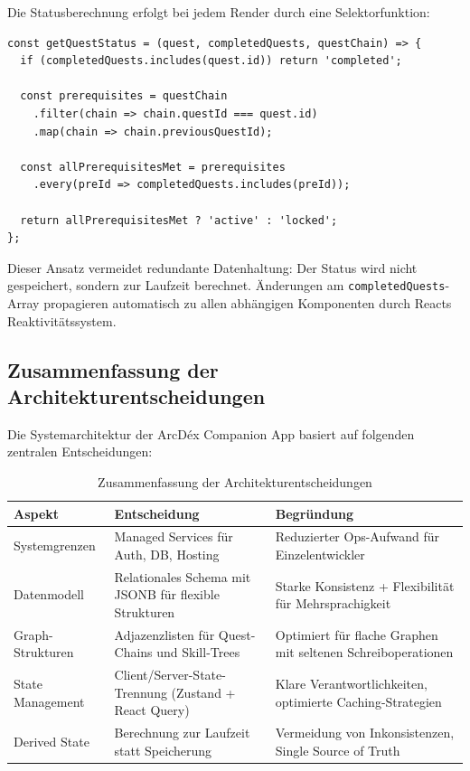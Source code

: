 Die Statusberechnung erfolgt bei jedem Render durch eine Selektorfunktion:

\begin{lstlisting}[caption={Quest-Status-Berechnung als Derived State}]
const getQuestStatus = (quest, completedQuests, questChain) => {
  if (completedQuests.includes(quest.id)) return 'completed';
  
  const prerequisites = questChain
    .filter(chain => chain.questId === quest.id)
    .map(chain => chain.previousQuestId);
  
  const allPrerequisitesMet = prerequisites
    .every(preId => completedQuests.includes(preId));
  
  return allPrerequisitesMet ? 'active' : 'locked';
};
\end{lstlisting}

Dieser Ansatz vermeidet redundante Datenhaltung: Der Status wird nicht gespeichert, sondern zur Laufzeit berechnet. Änderungen am \texttt{completedQuests}-Array propagieren automatisch zu allen abhängigen Komponenten durch Reacts Reaktivitätssystem.

\subsection{Zusammenfassung der Architekturentscheidungen}
\label{sec:architektur-zusammenfassung}

Die Systemarchitektur der ArcDéx Companion App basiert auf folgenden zentralen Entscheidungen:

\begin{table}[htbp]
\centering
\caption{Zusammenfassung der Architekturentscheidungen}
\label{tab:architektur-entscheidungen}
\begin{tabular}{lp{5cm}p{5.5cm}}
\toprule
\textbf{Aspekt} & \textbf{Entscheidung} & \textbf{Begründung} \\
\midrule
Systemgrenzen & Managed Services für Auth, DB, Hosting & Reduzierter Ops-Aufwand für Einzelentwickler \\
\addlinespace
Datenmodell & Relationales Schema mit JSONB für flexible Strukturen & Starke Konsistenz + Flexibilität für Mehrsprachigkeit \\
\addlinespace
Graph-Strukturen & Adjazenzlisten für Quest-Chains und Skill-Trees & Optimiert für flache Graphen mit seltenen Schreiboperationen \\
\addlinespace
State Management & Client/Server-State-Trennung (Zustand + React Query) & Klare Verantwortlichkeiten, optimierte Caching-Strategien \\
\addlinespace
Derived State & Berechnung zur Laufzeit statt Speicherung & Vermeidung von Inkonsistenzen, Single Source of Truth \\
\bottomrule
\end{tabular}
\end{table}

